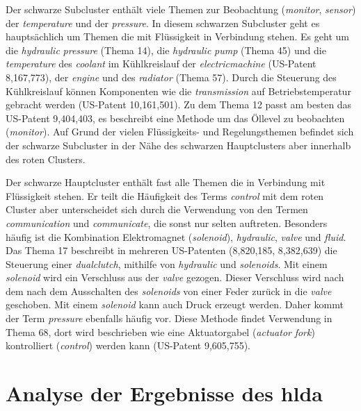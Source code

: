 Der schwarze Subcluster enthält viele Themen zur Beobachtung (\emph{monitor}, \emph{sensor}) der \emph{temperature} und der \emph{pressure}. In diesem schwarzen Subcluster geht es hauptsächlich um Themen die mit Flüssigkeit in Verbindung stehen. Es geht um die \emph{hydraulic} \emph{pressure} (Thema 14), die \emph{hydraulic} \emph{pump} (Thema 45) und die \emph{temperature} des \emph{coolant} im Kühlkreislauf der \emph{electricmachine} (US-Patent 8,167,773), der \emph{engine} und des \emph{radiator} (Thema 57). Durch die Steuerung des Kühlkreislauf können Komponenten wie die \emph{transmission} auf Betriebstemperatur gebracht werden (US-Patent 10,161,501). Zu dem Thema 12 passt am besten das US-Patent 9,404,403, es beschreibt eine Methode um das Öllevel zu beobachten (\emph{monitor}). Auf Grund der vielen Flüssigkeits- und Regelungsthemen befindet sich der schwarze Subcluster in der Nähe des schwarzen Hauptclusters aber innerhalb des roten Clusters.


Der schwarze Hauptcluster enthält fast alle Themen die in Verbindung mit Flüssigkeit stehen. Er teilt die Häufigkeit des Terms \emph{control} mit dem roten Cluster aber unterscheidet sich durch die Verwendung von den Termen \emph{communication} und \emph{communicate}, die sonst nur selten auftreten. Besonders häufig ist die Kombination Elektromagnet (\emph{solenoid}), \emph{hydraulic}, \emph{valve} und \emph{fluid}. Das Thema 17 beschreibt in mehreren US-Patenten (8,820,185, 8,382,639) die Steuerung einer \emph{dualclutch}, mithilfe von \emph{hydraulic} und \emph{solenoids}. Mit einem \emph{solenoid} wird ein Verschluss aus der \emph{valve} gezogen. Dieser Verschluss wird nach dem nach dem Ausschalten des \emph{solenoids} von einer Feder zurück in die \emph{valve} geschoben. Mit einem \emph{solenoid} kann auch Druck erzeugt werden. Daher kommt der Term \emph{pressure} ebenfalls häufig vor. Diese Methode findet Verwendung in Thema 68, dort wird beschrieben wie eine Aktuatorgabel (\emph{actuator} \emph{fork}) kontrolliert (\emph{control}) werden kann (US-Patent 9,605,755).
 
 
 
 
 
 
 
 


\section{Analyse der Ergebnisse des \gls{hlda}}

